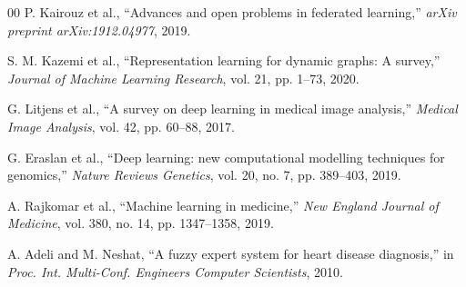 \documentclass[conference]{IEEEtran}
\begin{document}
\begin{thebibliography}{00}
P. Kairouz et al., ``Advances and open problems in federated learning,'' \textit{arXiv preprint arXiv:1912.04977}, 2019.

S. M. Kazemi et al., ``Representation learning for dynamic graphs: A survey,'' \textit{Journal of Machine Learning Research}, vol. 21, pp. 1--73, 2020.

G. Litjens et al., ``A survey on deep learning in medical image analysis,'' \textit{Medical Image Analysis}, vol. 42, pp. 60--88, 2017.

G. Eraslan et al., ``Deep learning: new computational modelling techniques for genomics,'' \textit{Nature Reviews Genetics}, vol. 20, no. 7, pp. 389--403, 2019.

A. Rajkomar et al., ``Machine learning in medicine,'' \textit{New England Journal of Medicine}, vol. 380, no. 14, pp. 1347--1358, 2019.

A. Adeli and M. Neshat, ``A fuzzy expert system for heart disease diagnosis,'' in \textit{Proc. Int. Multi-Conf. Engineers Computer Scientists}, 2010.

\end{thebibliography}
\end{document}
